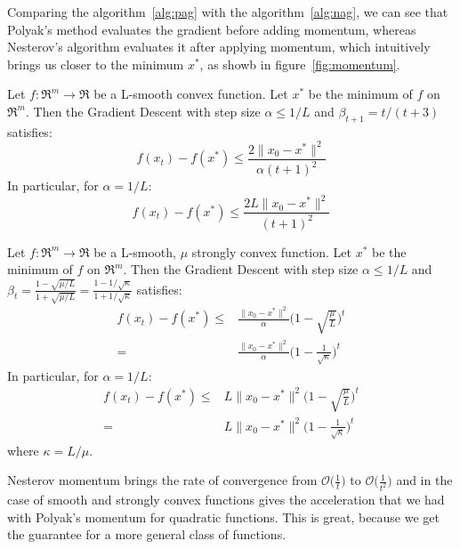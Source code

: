 Comparing the algorithm~\ref{alg:pag} with the algorithm~\ref{alg:nag}, we can see that Polyak’s method evaluates the gradient before adding momentum, whereas Nesterov’s algorithm evaluates it after applying momentum, which intuitively brings us closer to the minimum $x^*$, as showb in figure~\ref{fig:momentum}.

\begin{theorem} \label{thm:cvx_nag_convergence}
Let $f: \Re^m \rightarrow \Re$ be a L-smooth convex function. Let $x^*$ be the minimum of $f$ on $\Re^m$. Then the Gradient Descent with step size $\alpha \leq 1/L$ and $\beta_{t+1} = t / (t+3)$ satisfies:
$$
f(x_t) - f(x^*) \leq \frac{2 \| x_0 - x^* \|^2}{\alpha (t+1)^2}
$$
In particular, for $\alpha = 1/L$:
$$
f(x_t) - f(x^*) \leq \frac{2L \| x_0 - x^* \|^2}{(t+1)^2}
$$
\end{theorem}

\begin{theorem} \label{thm:str_cvx_nag_convergence}
Let $f: \Re^m \rightarrow \Re$ be a L-smooth, $\mu$ strongly convex function. Let $x^*$ be the minimum of $f$ on $\Re^m$. Then the Gradient Descent with step size $\alpha \leq 1/L$ and $\beta_t = \displaystyle \frac{1 - \sqrt{\mu / L}}{1 + \sqrt{\mu / L}} = \frac{1-1/\sqrt{\kappa}}{1+1/\sqrt{\kappa}}$ satisfies:
$$
\begin{aligned}
	f(x_t) - f(x^*) \leq & \frac{\| x_0 - x^* \|^2}{\alpha} \Bigg(1 - \sqrt{\frac{\mu}{L}}\Bigg)^t \\
						= & \frac{\| x_0 - x^* \|^2}{\alpha} \Bigg(1 - \frac{1}{\sqrt{\kappa}}\Bigg)^t
\end{aligned}
$$
In particular, for $\alpha = 1/L$:
$$
\begin{aligned}
	f(x_t) - f(x^*) \leq & L \| x_0 - x^* \|^2 \Bigg(1 - \sqrt{\frac{\mu}{L}}\Bigg)^t \\
						= & L \| x_0 - x^* \|^2 \Bigg(1 - \frac{1}{\sqrt{\kappa}}\Bigg)^t
\end{aligned}
$$
where $\kappa = L/\mu$.
\end{theorem}

Nesterov momentum brings the rate of convergence from $\displaystyle \mathcal{O}\Big(\frac{1}{t}\Big)$ to $\displaystyle \mathcal{O}\Big(\frac{1}{t^2}\Big)$ and in the case of smooth and strongly convex functions gives the acceleration that we had with Polyak’s momentum for quadratic functions. This is great, because we get the guarantee for a more general class of functions.

